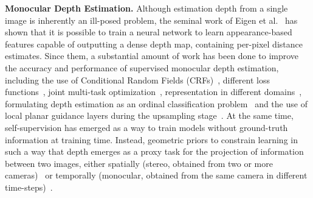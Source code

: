  \noindent\textbf{Monocular Depth Estimation.} Although estimation depth from a single image is inherently an ill-posed problem, the seminal work of Eigen et al.~\cite{eigen2014depth} has shown that it is possible to train a neural network to learn appearance-based features capable of outputting a dense depth map, containing per-pixel distance estimates. Since them, a substantial amount of work has been done to improve the accuracy and performance of supervised monocular depth estimation, including the use of Conditional Random Fields (CRFs)~\cite{depthcrf}, different loss functions~\cite{huberloss,packnet-semisup}, joint multi-task optimization~\cite{normalscvpr2,selfsupsem,packnet-semguided}, representation in different domains~\cite{fouriercvpr}, formulating depth estimation as an ordinal classification problem~\cite{dorncvpr} and the use of local planar guidance layers during the upsampling stage~\cite{lee2019big}. At the same time, self-supervision has emerged as a way to train models without ground-truth information at training time. Instead, geometric priors to constrain learning in such a way that depth emerges as a proxy task for the projection of information between two images, either spatially (stereo, obtained from two or more cameras)~\cite{pillai2018superdepth, zhou2018stereo, ummenhofer2017demon} or temporally (monocular, obtained from the same camera in different time-steps)~\cite{packnet,godard2018digging2,vijayanarasimhan2017sfm}. 














